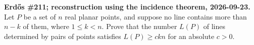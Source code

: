 \textbf{Erd\H{o}s \#211; reconstruction using the incidence theorem, 2026-09-23.}
Let $P$ be a set of $n$ real planar points, and suppose no line contains more than $n-k$ of them, where $1\leq k<n$. Prove that the number $L(P)$ of lines determined by pairs of points satisfies $L(P)\geq ckn$ for an absolute $c>0$.
